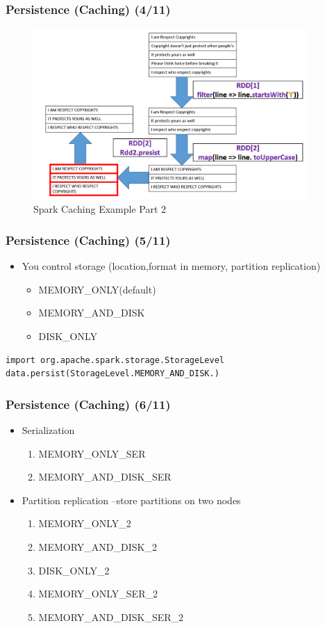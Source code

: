 \begin{frame}
	  \frametitle{Persistence (Caching) (4/11)}
	    \begin{figure}
	  	\caption{Spark Caching Example Part 2}  		  	
			\includegraphics[width=\textwidth,height=6.5cm]{Graphics/cashe2.PNG}
		\end{figure}
\end{frame}

\begin{frame}[fragile]
	  \frametitle{Persistence (Caching) (5/11)}
	\begin{itemize}[<+->]
		\item You control storage (location,format in memory, partition replication)
			\begin{itemize}
				\item MEMORY\_ONLY(default)
				\item MEMORY\_AND\_DISK
				\item DISK\_ONLY
			\end{itemize}
	\end{itemize}
		\begin{lstlisting}[style=myScalastyle, caption=Persistence Storage Level Example]
import org.apache.spark.storage.StorageLevel
data.persist(StorageLevel.MEMORY_AND_DISK.)
		\end{lstlisting}
\end{frame}


\begin{frame}
	  \frametitle{Persistence (Caching) (6/11)}
	\begin{itemize}[<+->]
		\item Serialization
			\begin{enumerate}
			\item MEMORY\_ONLY\_SER
			\item MEMORY\_AND\_DISK\_SER
			\end{enumerate}
		\item Partition replication –store partitions on two nodes
			\begin{enumerate}
			\item MEMORY\_ONLY\_2
			\item MEMORY\_AND\_DISK\_2
			\item DISK\_ONLY\_2
			\item MEMORY\_ONLY\_SER\_2
			\item MEMORY\_AND\_DISK\_SER\_2
			\end{enumerate}

	\end{itemize}
\end{frame}

